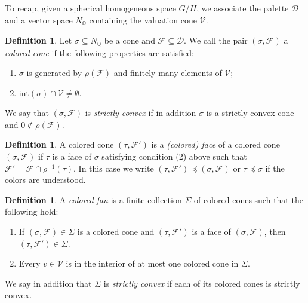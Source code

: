 \documentclass[12pt,twoside,cd]{amsart}
\theoremstyle{definition}
\newtheorem{definition}[theorem]{Definition}
\begin{document}
To recap, given a spherical homogeneous space $G/H$, we associate the palette $\mathcal{D}$ and a vector space $N_\mathbb{Q}$ containing the valuation cone $\mathcal{V}$. 
\begin{definition}
Let $\sigma \subseteq N_\mathbb{Q}$ be a cone and $\mathcal{F} \subseteq \mathcal{D}$. We call the pair $(\sigma,\mathcal{F})$ a \emph{colored cone} if the following properties are satisfied:
\begin{enumerate}
\item[1)] $\sigma$ is generated by $\rho(\mathcal{F})$ and finitely many elements of $\mathcal{V}$;
\item[2)] $\text{int}(\sigma) \cap \mathcal{V} \neq \emptyset$.
\end{enumerate}
We say that $(\sigma,\mathcal{F})$ is \emph{strictly convex} if in addition $\sigma$ is a strictly convex cone and $0 \notin \rho(\mathcal{F})$.
\end{definition}
\begin{definition}
A colored cone $(\tau,\mathcal{F}')$ is a  \emph{(colored) face} of a colored cone $(\sigma,\mathcal{F})$ if $\tau$ is a face of $\sigma$ satisfying condition (2) above such that $\mathcal{F}' = \mathcal{F} \cap \rho^{-1}(\tau)$. In this case we write $(\tau,\mathcal{F}') \preceq (\sigma,\mathcal{F})$ or $\tau \preceq \sigma$ if the colors are understood.
\end{definition}
\begin{definition}
A \emph{colored fan} is a finite collection $\Sigma$ of colored cones such that the following hold:
\begin{enumerate}
\item If $(\sigma,\mathcal{F}) \in \Sigma$ is a colored cone and $(\tau,\mathcal{F}')$ is a face of $(\sigma,\mathcal{F})$, then $(\tau,\mathcal{F}') \in \Sigma$.
\item Every $v \in \mathcal{V}$ is in the interior of at most one colored cone in $\Sigma$.
\end{enumerate}
We say in addition that $\Sigma$ is \emph{strictly convex} if each of its colored cones is strictly convex.
\end{definition}
\end{document}
